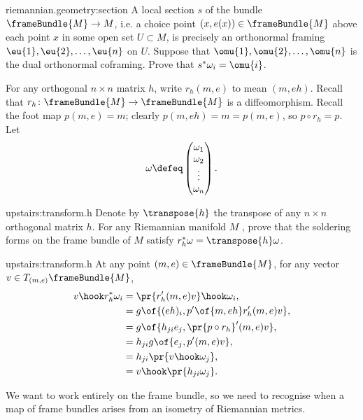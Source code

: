 \begin{problem}{riemannian.geometry:section}
A local section \(s\) of the bundle \(\frameBundle{M} \to M\), i.e. a choice point \((x,e(x)) \in \frameBundle{M}\) above each point \(x\) in some open set \(U \subset M\), is precisely an orthonormal framing \(\eu{1},\eu{2}, \dots, \eu{n}\) on \(U\).
Suppose that \(\omu{1}, \omu{2}, \dots, \omu{n}\) is the dual orthonormal coframing.
Prove that \(s^* \omega_i = \omu{i}\).
\end{problem}

For any orthogonal \(n \times n\) matrix \(h\), write \(r_h(m,e)\) to mean \((m,eh)\).
Recall that \(r_h \colon \frameBundle{M} \to \frameBundle{M}\) is a diffeomorphism.
Recall the foot map \(p(m,e)=m\); clearly \(p(m,eh)=m=p(m,e)\), so \(p \circ r_h=p\).
Let
\[
\omega\defeq
\begin{pmatrix}
\omega_1 \\
\omega_2 \\
\vdots \\
\omega_n
\end{pmatrix}.
\]
\begin{problem}{upstairs:transform.h}
Denote by \(\transpose{h}\) the transpose of any \(n \times n\) orthogonal matrix \(h\).
For any Riemannian manifold \(M\) , prove that the soldering forms on the frame bundle of \(M\) satisfy \(r_h^* \omega = \transpose{h} \omega\).
\end{problem}
\begin{answer}{upstairs:transform.h}
At any point \((m,e) \in \frameBundle{M}\), for any vector \(v \in T_{(m,e)} \frameBundle{M}\),
\begin{align*}
v \hook r_h^* \omega_i
&=
\pr{r_h'(m,e) v} \hook \omega_i,
\\
&=
g\of{(eh)_i, p'\of{m,eh} r_h'(m,e) v},
\\
&=
g\of{h_{ji} e_j,\pr{p \circ r_h}'(m,e) v},
\\
&=
h_{ji} g\of{e_j,p'(m,e) v},
\\
&=
h_{ji} \pr{v \hook \omega_j},
\\
&=
v \hook \pr{h_{ji} \omega_j}.
\end{align*}
\end{answer}
We want to work entirely on the frame bundle, so we need to recognise when a map of frame bundles arises from an isometry of Riemannian metrics.
